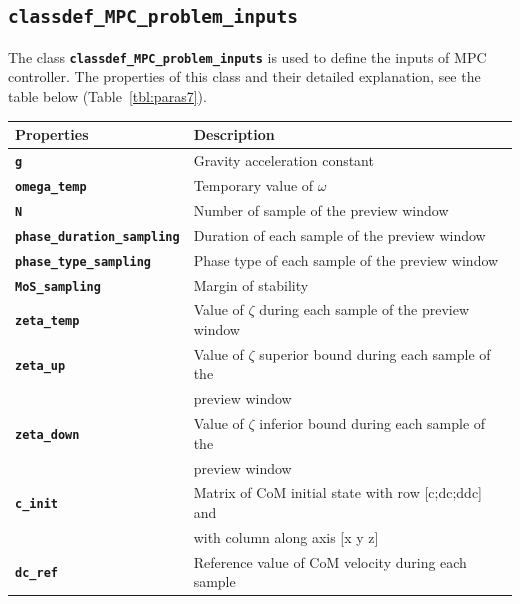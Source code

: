 \documentclass[12pt,oneside,notitlepage,abstracton,a4paper]{scrartcl}
\begin{document}
\nopagebreak
\pagebreak  
\subsection{\textbf{\texttt{classdef\_MPC\_problem\_inputs}}} \label{cls_mpc_inp} 
The class \textbf{\texttt{classdef\_MPC\_problem\_inputs}} is used to define the inputs of MPC controller.
The properties of this class and their detailed explanation, see the table below (Table~\ref{tbl:paras7}). 

\begin{table}[!htbp] 
\begin{center}
\begin{tabular}{|l|l|}
  \hline
  \rowcolor{green!25}\bf {\small Properties}      & \bf {\small Description}  \\ \hline 
 \textbf{\texttt{g}}         & Gravity acceleration constant \\ \hline 
 \textbf{\texttt{omega\_temp}}         & Temporary value of $\omega$ \\ \hline 
 \textbf{\texttt{N}}         &  Number of sample of the preview window\\ \hline
 \textbf{\texttt{phase\_duration\_sampling}}         & Duration of each sample of the preview window \\ \hline 
 \textbf{\texttt{phase\_type\_sampling}}         & Phase type of each sample of the preview window \\ \hline 
 \textbf{\texttt{MoS\_sampling}}         &  Margin of stability\\ \hline
 \textbf{\texttt{zeta\_temp}}         & Value of $\zeta$ during each sample of the preview window \\ \hline 
 \textbf{\texttt{zeta\_up}}         & Value of $\zeta$ superior bound during each sample of the \\    
                                 &  preview window \\ \hline  
 \textbf{\texttt{zeta\_down}}         &  Value of $\zeta$ inferior bound during each sample of the  \\    
                                 &  preview window \\ \hline  
 \textbf{\texttt{c\_init}}         & Matrix of CoM initial state with row [c;dc;ddc] and    \\    
                                 & with column along axis [x y z] \\ \hline   
 \textbf{\texttt{dc\_ref}}         & Reference value of CoM velocity during each sample \\    

\end{tabular}
\end{center}
\end{table}
\end{document}
